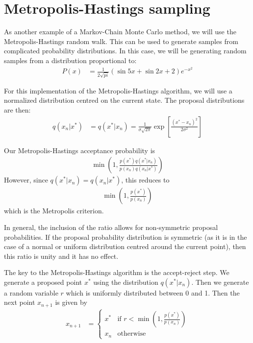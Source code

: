 \documentclass[twocolumn]{myarticle}
\begin{document}
\section{Metropolis-Hastings sampling}
\label{sec:metropolis_hastings_sampling}

As another example of a Markov-Chain Monte Carlo method, we will use the Metropolis-Hastings random walk.
This can be used to generate samples from complicated probability distributions.
In this case, we will be generating random samples from a distribution proportional to:
\begin{align}
    P(x) &= \frac{1}{2 \sqrt{pi}} \left( \sin 5x + \sin 2x + 2 \right) e^{-x^2}
    \label{eq:p_of_x}
\end{align}

For this implementation of the Metropolis-Hastings algorithm, we will use a normalized distribution centred on the current state.
The proposal distributions are then:
\begin{align}
    q\left(x_n | x^*\right) &= q\left(x^* | x_n\right) = \frac{1}{\sigma \sqrt{2\pi}} \exp \left[\frac{(x^* - x_n)^2}{2\sigma^2}\right]
\end{align}

Our Metropolis-Hastings acceptance probability is
\begin{align}
    \min \left( 1, \frac{p(x^*) q(x^*|x_n)}{p(x_n) q(x_n|x^*)} \right)
\end{align}
However, since $ q(x^*|x_n) = q(x_n|x^*) $, this reduces to
\begin{align}
    \min \left( 1, \frac{p(x^*)}{p(x_n)} \right)
\end{align}
which is the Metropolis criterion.

In general, the inclusion of the ratio allows for non-symmetric proposal probabilities.
If the proposal probability distribution is symmetric (as it is in the case of a normal or uniform distribution centred around the current point), then this ratio is unity and it has no effect.

The key to the Metropolis-Hastings algorithm is the accept-reject step.
We generate a proposed point $ x^* $ using the distribution $ q(x^* | x_n) $.
Then we generate a random variable $ r $ which is uniformly distributed between 0 and 1.
Then the next point $ x_{n+1} $ is given by
\begin{align}
    x_{n+1} &= \begin{cases} x^* & \text{if } r < \min \left( 1, \frac{p(x^*)}{p(x_n)} \right) \\ x_n & \text{otherwise} \end{cases}
\end{align}
\end{document}
